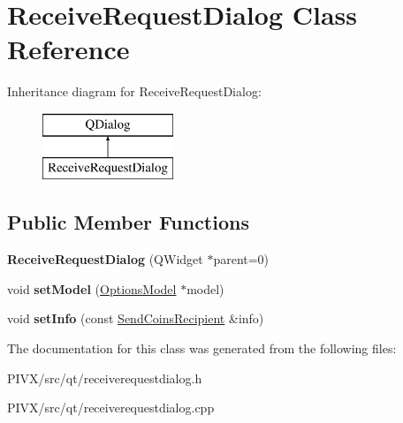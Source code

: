 \hypertarget{class_receive_request_dialog}{}\section{Receive\+Request\+Dialog Class Reference}
\label{class_receive_request_dialog}
Inheritance diagram for Receive\+Request\+Dialog\+:\begin{figure}[H]
\begin{center}
\leavevmode
\includegraphics[height=2.000000cm]{class_receive_request_dialog}
\end{center}
\end{figure}
\subsection*{Public Member Functions}
\begin{DoxyCompactItemize}
\item 
\mbox{\label{class_receive_request_dialog_afb469cd7a503978ef5e212aa660ab950}} 
{\bfseries Receive\+Request\+Dialog} (Q\+Widget $\ast$parent=0)
\item 
\mbox{\label{class_receive_request_dialog_ad57b3bf409346660842360836fd8569d}} 
void {\bfseries set\+Model} (\mbox{\hyperlink{class_options_model}{Options\+Model}} $\ast$model)
\item 
\mbox{\label{class_receive_request_dialog_a43344270ef71e68ad9c7a931cc0ca9ed}} 
void {\bfseries set\+Info} (const \mbox{\hyperlink{class_send_coins_recipient}{Send\+Coins\+Recipient}} \&info)
\end{DoxyCompactItemize}


The documentation for this class was generated from the following files\+:\begin{DoxyCompactItemize}
\item 
P\+I\+V\+X/src/qt/receiverequestdialog.\+h\item 
P\+I\+V\+X/src/qt/receiverequestdialog.\+cpp\end{DoxyCompactItemize}
